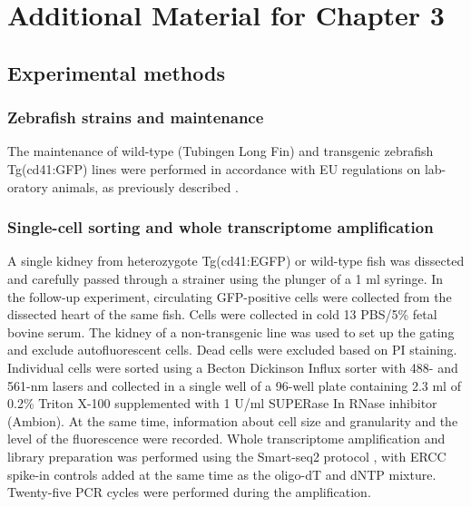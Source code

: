 
\chapter{Additional Material for Chapter 3}

\graphicspath{{Appendix2/Figs/}}

\section{Experimental methods}

\subsection{Zebrafish strains and maintenance}

The maintenance of wild-type (Tubingen Long Fin) and transgenic zebrafish Tg(cd41:GFP) lines were performed in accordance with EU regulations on lab- oratory animals, as previously described \cite{Bielczyk-Maczynska2014-hf}.

\subsection{Single-cell sorting and whole transcriptome amplification}

A single kidney from heterozygote Tg(cd41:EGFP) or wild-type fish was dissected and carefully passed through a strainer using the plunger of a 1 ml syringe. In the follow-up experiment, circulating GFP-positive cells were collected from the dissected heart of the same fish. Cells were collected in cold 13 PBS/5\% fetal bovine serum. The kidney of a non-transgenic line was used to set up the gating and exclude autofluorescent cells. Dead cells were excluded based on PI staining. Individual cells were sorted using a Becton Dickinson Influx sorter with 488- and 561-nm lasers \cite{Schulte2015-dh} and collected in a single well of a 96-well plate containing 2.3 ml of 0.2\% Triton X-100 supplemented with 1 U/ml SUPERase In RNase inhibitor (Ambion). At the same time, information about cell size and granularity and the level of the fluorescence were recorded. Whole transcriptome amplification and library preparation was performed using the Smart-seq2 protocol  \cite{Picelli2013-px, Picelli2014-hr}, with ERCC spike-in controls added at the same time as the oligo-dT and dNTP mixture. Twenty-five PCR cycles were performed during the amplification.

